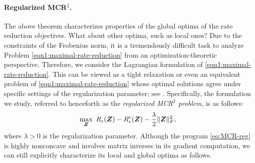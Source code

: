 \documentclass[../../book-main.tex]{subfiles}
\begin{document}
\paragraph{Regularized MCR$^2$.}
The above theorem characterizes properties of the global optima of the rate reduction objectives. What about other optima, such as local ones?  Due to the constraints of the Frobenius norm, it is a tremendously difficult task to analyze Problem \eqref{eqn1:maximal-rate-reduction} from an optimization-theoretic perspective. Therefore, we consider the Lagrangian formulation of \eqref{eqn1:maximal-rate-reduction}. This can be viewed as a tight relaxation or even an equivalent problem of \eqref{eqn1:maximal-rate-reduction} whose optimal solutions agree under specific settings of the regularization parameter; see \cite[Proposition 1]{wang2024global}.
Specifically, the formulation we study, referred to henceforth as the \textit{regularized MCR$^2$ problem}, is as follows:
\begin{align}\label{eq:MCR-reg}
	\max_{\bm Z}\ R_{\epsilon}(\bm{Z}) - R_{\epsilon}^c(\bm{Z}) - \frac{\lambda}{2}\|\bm Z\|_F^2,
\end{align}
where $\lambda > 0$ is the regularization parameter. Although the program  \eqref{eq:MCR-reg} is highly nonconcave and involves matrix inverses in its gradient computation, we can still explicitly characterize its local and global optima as follows.
\end{document}
